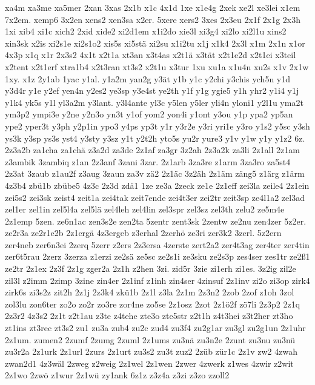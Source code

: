 {xa4m
xa3me
xa5mer
2xan
3xas
2x1b
x1c
4x1d
1xe
x1e4g
2xek
xe2l
xe3lei
x1em
7x2em.
xemp6
3x2en
xens2
xen3sa
x2er.
5xere
xers2
3xes
2x3eu
2x1f
2x1g
2x3h
1xi
xib4
xi1c
xich2
2xid
xide2
xi2d1em
x1i2do
xie3l
xi3g4
xi2lo
xi2l1u
xins2
xin3sk
x2is
xi2s1e
xi2s1o2
xis5s
xi5stä
xi2su
x1i2tu
x1j
x1k4
2x3l
x1m
2x1n
x1or
4x3p
x1q
x1r
2x3s2
4x1t
x2t1a
xt3an
x3t4as
x2t1ä
x3tät
x2t1e2d
x2t1ei
x3teil
x2tent
x2t1erf
xtra1b4
x2t3ran
xt3s2
x2t1u
x3tur
1xu
xu1a
x1u4n
xu2s
x1v
2x1w
1xy.
x1z
2y1ab
1yac
y1al.
y1a2m
yan2g
y3ät
y1b
y1c
y2chi
y3chis
ych5n
y1d
y3d4r
y1e
y2ef
yen4n
y2es2
ye3sp
y3e4st
ye2th
y1f
y1g
ygie5
y1h
yhr2
y1i4
y1j
y1k4
yk5s
y1l
yl3a2m
y3lant.
y3l4ante
yl3c
y5len
y5ler
yli4n
yloni1
y2l1u
yma2t
ym3p2
ympi3e
y2ne
y2n3o
yn3t
y1of
yom2
yon4i
y1ont
y3ou
y1p
ypa2
yp5an
ype2
yper3t
y3ph
y2p1in
ypo3
y4ps
yp3t
y1r
y3r2e
y3ri
yri1e
y3ro
y1s2
y5sc
y3sh
ys3k
y3sp
ys3s
yst4
y3sty
y3sz
y1t
y2t2h
yto5s
yu2r
yure3
y1v
y1w
y1y
y1z2
6z.
2z3a2b
za1cha
za1chä
z3a2d
za3de
2z1af
za3gr
3z2ah
2z3a2k
za3li
2z1all
2z1am
z3ambik
3zambiq
z1an
2z3anf
3zani
3zar.
2z1arb
3za3re
z1arm
3za3ro
za5st4
2z3at
3zaub
z1au2f
z3aug
3zaun
za3v
zä2
2z1äc
3z2äh
2z1äm
zäng5
z1ärg
z1ärm
4z3b4
zbü1b
zbübe5
4z3c
2z3d
zdä1
1ze
ze3a
2zeck
ze1e
2z1eff
zei3la
zeile4
2z1ein
zei5s2
zei3sk
zeist4
zeit1a
zei4tak
zeit7ende
zei4t3er
zei2tr
zeit3sp
ze4l1a2
zel3ad
zel1er
zel1in
zel5l4a
zel5lä
zel4leh
zel4lin
zel3spr
zel3sz
zel3th
zelu2
ze5m4e
2z1emp
5zen.
ze6n1ac
zen3s2e
zen2ta
5zentr
zent3sk
2zentw
ze2nu
zen4zer
5z2er.
ze2r3a
ze2r1e2b
2z1ergä
4z3ergeb
z3erhal
2zerhö
ze3ri
zer3k2
3zerl.
5z2ern
zer4neb
zer6n3ei
2zerq
5zerr
z2ers
2z3ersa
4zerste
zert2a2
zer4t3ag
zer4ter
zer4tin
zer6t5rau
2zerz
3zerza
z1erzi
ze2sä
ze5sc
ze2s1i
ze3sku
ze2s3p
zes4ser
zes1tr
ze2ß1
ze2tr
2z1ex
2z3f
2z1g
zger2a
2z1h
z2hen
3zi.
zid5r
3zie
zi1erh
zi1es.
3z2ig
zil2e
zil3l
z2imm
2zimp
3zine
zin4er
2z1inf
z1inh
zin4ser
4zinsuf
2z1inv
zi2o
zi3op
zirk4
zirk6s
zi3s2z
zit2h
2z1j
2z3k4
zkü1b
2z1l
z3la
2z1m
2z3n2
2zob
2zof
z1oh
3zol
zol3lu
zon6ter
zo2o
zo2r
zo3re
zor4ne
zo5se
2z1osz
2zot
2z1ö2f
zö7li
2z3p2
2z1q
2z3r2
4z3s2
2z1t
z2t1au
z3te
z4tehe
zte3o
zte5str
z2t1h
z4t3hei
z3t2her
zt3ho
zt1ins
zt3rec
zt3s2
zu1
zu3a
zub4
zu2c
zud4
zu3f4
zu2g1ar
zu3gl
zu2g1un
2z1uhr
2z1um.
zumen2
2zumf
2zumg
2zuml
2z1ums
zu3nä
zu3n2e
2zunt
zu3nu
zu3nü
zu3r2a
2z1urk
2z1url
2zurs
2z1urt
zu3s2
zu3t
zuz2
2züb
zür1c
2z1v
zw2
4zwah
zwan2d1
4z3wäl
2zweg
z2weig
2z1wel
2z1wen
2zwer
4zwerk
z1wes
4zwir
z2wit
2z1wo
2zwö
z1wur
2z1wü
zy1ank
6z1z
z3z4a
z3zi
z3zo
zzoll2
}

